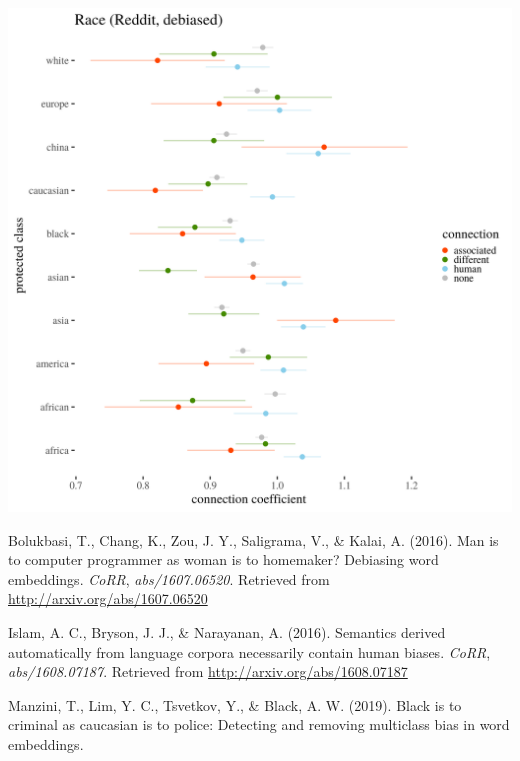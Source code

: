 \documentclass[12pt,]{book}
\begin{document}
\includegraphics[width=14cm]{../images/visDebRaceReddit.png}

\hypertarget{refs}{}
\hypertarget{ref-Bolukbasi2016Man}{}
Bolukbasi, T., Chang, K., Zou, J. Y., Saligrama, V., \& Kalai, A.
(2016). Man is to computer programmer as woman is to homemaker?
Debiasing word embeddings. \emph{CoRR}, \emph{abs/1607.06520}. Retrieved
from \url{http://arxiv.org/abs/1607.06520}

\hypertarget{ref-Caliskan2017Semantics}{}
Islam, A. C., Bryson, J. J., \& Narayanan, A. (2016). Semantics derived
automatically from language corpora necessarily contain human biases.
\emph{CoRR}, \emph{abs/1608.07187}. Retrieved from
\url{http://arxiv.org/abs/1608.07187}

\hypertarget{ref-manzini2019black}{}
Manzini, T., Lim, Y. C., Tsvetkov, Y., \& Black, A. W. (2019). Black is
to criminal as caucasian is to police: Detecting and removing multiclass
bias in word embeddings.
\end{document}
